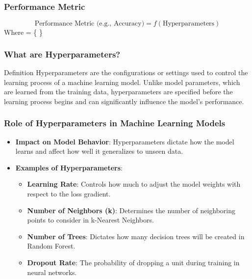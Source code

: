 \documentclass[aspectratio=169]{beamer}
\begin{document}
\begin{frame}[fragile]
    \frametitle{Performance Metric}
    \begin{equation}
        \text{Performance Metric (e.g., Accuracy)} = f(\text{Hyperparameters})
    \end{equation}
    Where  = \{  \}
\end{frame}

\begin{frame}[fragile]
    \frametitle{What are Hyperparameters?}
    \begin{block}{Definition}
        Hyperparameters are the configurations or settings used to control the learning process of a machine learning model. 
        Unlike model parameters, which are learned from the training data, hyperparameters are specified before the learning process begins and can significantly influence the model's performance.
    \end{block}
\end{frame}

\begin{frame}[fragile]
    \frametitle{Role of Hyperparameters in Machine Learning Models}
    \begin{itemize}
        \item \textbf{Impact on Model Behavior}: Hyperparameters dictate how the model learns and affect how well it generalizes to unseen data.
        \item \textbf{Examples of Hyperparameters}:
        \begin{itemize}
            \item \textbf{Learning Rate}: Controls how much to adjust the model weights with respect to the loss gradient.
            \item \textbf{Number of Neighbors (k)}: Determines the number of neighboring points to consider in k-Nearest Neighbors.
            \item \textbf{Number of Trees}: Dictates how many decision trees will be created in Random Forest.
            \item \textbf{Dropout Rate}: The probability of dropping a unit during training in neural networks.
        \end{itemize}
    \end{itemize}
\end{frame}
\end{document}
